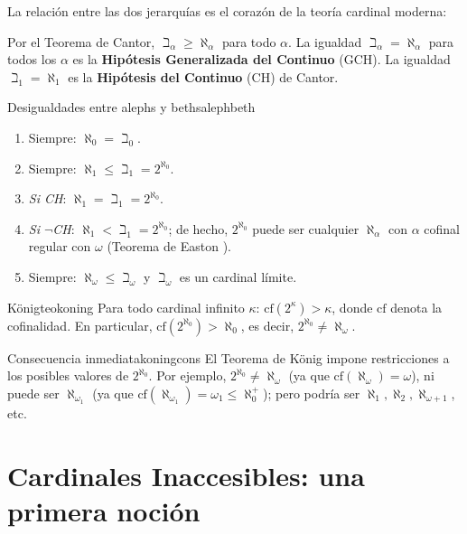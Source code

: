 La relación entre las dos jerarquías es el corazón de la teoría cardinal moderna:

\begin{importante}
Por el Teorema de Cantor, $\beth_\alpha \geq \aleph_\alpha$ para todo $\alpha$. La igualdad $\beth_\alpha = \aleph_\alpha$ para todos los $\alpha$ es la \textbf{Hipótesis Generalizada del Continuo} (GCH). La igualdad $\beth_1 = \aleph_1$ es la \textbf{Hipótesis del Continuo} (CH) de Cantor.
\end{importante}

\begin{ejemplo}{Desigualdades entre alephs y beths}{alephbeth}
\begin{enumerate}[leftmargin=2em, label=(\alph*)]
  \item Siempre: $\aleph_0 = \beth_0$.
  \item Siempre: $\aleph_1 \leq \beth_1 = 2^{\aleph_0}$.
  \item \textit{Si CH}: $\aleph_1 = \beth_1 = 2^{\aleph_0}$.
  \item \textit{Si $\neg$CH}: $\aleph_1 < \beth_1 = 2^{\aleph_0}$; de hecho, $2^{\aleph_0}$ puede ser cualquier $\aleph_\alpha$ con $\alpha$ cofinal regular con $\omega$ (Teorema de Easton \cite{jech2003}).
  \item Siempre: $\aleph_\omega \leq \beth_\omega$ y $\beth_\omega$ es un cardinal límite.
\end{enumerate}
\end{ejemplo}

\begin{teorema}{König}{teokoning}
Para todo cardinal infinito $\kappa$: $\mathrm{cf}(2^\kappa) > \kappa$, donde $\mathrm{cf}$ denota la cofinalidad. En particular, $\mathrm{cf}(2^{\aleph_0}) > \aleph_0$, es decir, $2^{\aleph_0} \neq \aleph_\omega$.
\end{teorema}

\begin{observacion}{Consecuencia inmediata}{koningcons}
El Teorema de König impone restricciones a los posibles valores de $2^{\aleph_0}$. Por ejemplo, $2^{\aleph_0} \neq \aleph_\omega$ (ya que $\mathrm{cf}(\aleph_\omega) = \omega$), ni puede ser $\aleph_{\omega_1}$ (ya que $\mathrm{cf}(\aleph_{\omega_1}) = \omega_1 \leq \aleph_0^+$); pero podría ser $\aleph_1, \aleph_2, \aleph_{\omega+1}$, etc.
\end{observacion}

\section{Cardinales Inaccesibles: una primera noción}

